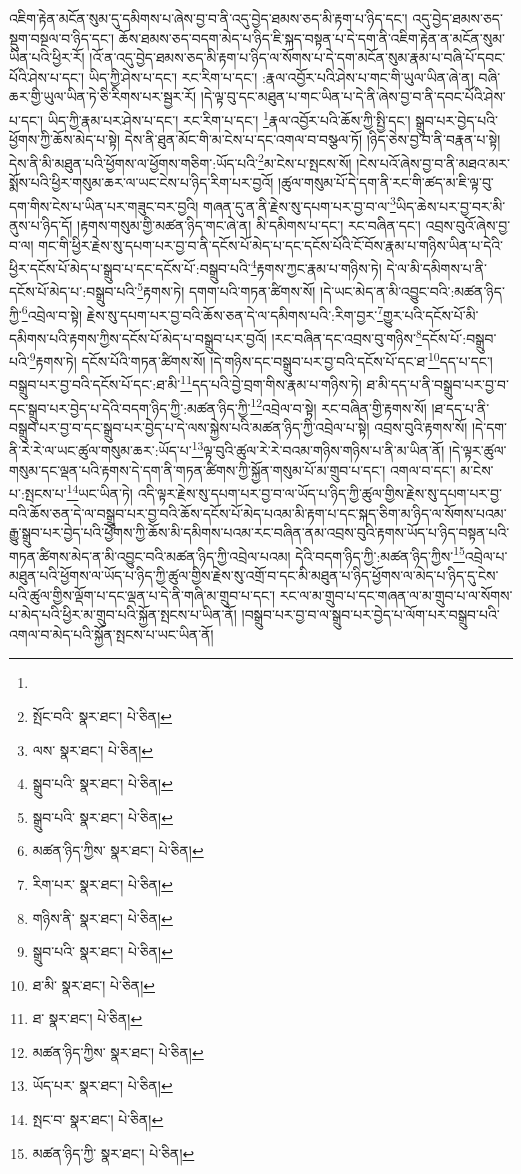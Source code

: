 འཇིག་རྟེན་མངོན་སུམ་དུ་དམིགས་པ་ཞེས་བྱ་བ་ནི་འདུ་བྱེད་ཐམས་ཅད་མི་རྟག་པ་ཉིད་དང་། འདུ་བྱེད་ཐམས་ཅད་སྡུག་བསྔལ་བ་ཉིད་དང་། ཆོས་ཐམས་ཅད་བདག་མེད་པ་ཉིད་ཇི་སྐད་བསྟན་པ་དེ་དག་ནི་འཇིག་རྟེན་ན་མངོན་སུམ་ཡིན་པའི་ཕྱིར་རོ། །འོ་ན་འདུ་བྱེད་ཐམས་ཅད་མི་རྟག་པ་ཉིད་ལ་སོགས་པ་དེ་དག་མངོན་སུམ་རྣམ་པ་བཞི་པོ་དབང་པོའི་ཤེས་པ་དང་། ཡིད་ཀྱི་ཤེས་པ་དང་། རང་རིག་པ་དང་། :རྣལ་འབྱོར་པའི་ཤེས་པ་གང་གི་ཡུལ་ཡིན་ཞེ་ན། བཞི་ཆར་གྱི་ཡུལ་ཡིན་ཏེ་ཅི་རིགས་པར་སྦྱར་རོ། །དེ་ལྟ་བུ་དང་མཐུན་པ་གང་ཡིན་པ་དེ་ནི་ཞེས་བྱ་བ་ནི་དབང་པོའི་ཤེས་པ་དང་། ཡིད་ཀྱི་རྣམ་པར་ཤེས་པ་དང་། རང་རིག་པ་དང་། \footnote{}རྣལ་འབྱོར་པའི་ཆོས་ཀྱི་སྤྱི་དང་། སྒྲུབ་པར་བྱེད་པའི་ཕྱོགས་ཀྱི་ཆོས་མེད་པ་སྟེ། དེས་ནི་ཐུན་མོང་གི་མ་ངེས་པ་དང་འགལ་བ་བསྩལ་ཏོ། །ཉིད་ཅེས་བྱ་བ་ནི་བརྣན་པ་སྟེ། དེས་ནི་མི་མཐུན་པའི་ཕྱོགས་ལ་ཕྱོགས་གཅིག་:ཡོད་པའི་\footnote{སྤོང་བའི་  སྣར་ཐང་།  པེ་ཅིན། }མ་ངེས་པ་སྤངས་སོ། །ངེས་པའོ་ཞེས་བྱ་བ་ནི་མཐའ་མར་སྨོས་པའི་ཕྱིར་གསུམ་ཆར་ལ་ཡང་ངེས་པ་ཉིད་རིག་པར་བྱའོ། །ཚུལ་གསུམ་པོ་དེ་དག་ནི་རང་གི་ཚད་མ་ཇི་ལྟ་བུ་དག་གིས་ངེས་པ་ཡིན་པར་གཟུང་བར་བྱའི། གཞན་དུ་ན་ནི་རྗེས་སུ་དཔག་པར་བྱ་བ་ལ་\footnote{ལས་  སྣར་ཐང་།  པེ་ཅིན། }ཡིད་ཆེས་པར་བྱ་བར་མི་ནུས་པ་ཉིད་དོ། །རྟགས་གསུམ་གྱི་མཚན་ཉིད་གང་ཞེ་ན། མི་དམིགས་པ་དང་། རང་བཞིན་དང་། འབྲས་བུའོ་ཞེས་བྱ་བ་ལ། གང་གི་ཕྱིར་རྗེས་སུ་དཔག་པར་བྱ་བ་ནི་དངོས་པོ་མེད་པ་དང་དངོས་པོའི་ངོ་བོས་རྣམ་པ་གཉིས་ཡིན་པ་དེའི་ཕྱིར་དངོས་པོ་མེད་པ་སྒྲུབ་པ་དང་དངོས་པོ་:བསྒྲུབ་པའི་\footnote{སྒྲུབ་པའི་  སྣར་ཐང་།  པེ་ཅིན། }རྟགས་ཀྱང་རྣམ་པ་གཉིས་ཏེ། དེ་ལ་མི་དམིགས་པ་ནི་དངོས་པོ་མེད་པ་:བསྒྲུབ་པའི་\footnote{སྒྲུབ་པའི་  སྣར་ཐང་།  པེ་ཅིན། }རྟགས་ཏེ། དགག་པའི་གཏན་ཚིགས་སོ། །དེ་ཡང་མེད་ན་མི་འབྱུང་བའི་:མཚན་ཉིད་ཀྱི་\footnote{མཚན་ཉིད་ཀྱིས་  སྣར་ཐང་།  པེ་ཅིན། }འབྲེལ་བ་སྟེ། རྗེས་སུ་དཔག་པར་བྱ་བའི་ཆོས་ཅན་དེ་ལ་དམིགས་པའི་:རིག་བྱར་\footnote{རིག་པར་  སྣར་ཐང་།  པེ་ཅིན། }གྱུར་པའི་དངོས་པོ་མི་དམིགས་པའི་རྟགས་ཀྱིས་དངོས་པོ་མེད་པ་བསྒྲུབ་པར་བྱའོ། །རང་བཞིན་དང་འབྲས་བུ་གཉིས་\footnote{གཉིས་ནི་  སྣར་ཐང་།  པེ་ཅིན། }དངོས་པོ་:བསྒྲུབ་པའི་\footnote{སྒྲུབ་པའི་  སྣར་ཐང་།  པེ་ཅིན། }རྟགས་ཏེ། དངོས་པོའི་གཏན་ཚིགས་སོ། །དེ་གཉིས་དང་བསྒྲུབ་པར་བྱ་བའི་དངོས་པོ་དང་ཐ་\footnote{ཐ་མི་  སྣར་ཐང་།  པེ་ཅིན། }དད་པ་དང་། བསྒྲུབ་པར་བྱ་བའི་དངོས་པོ་དང་:ཐ་མི་\footnote{ཐ་  སྣར་ཐང་།  པེ་ཅིན། }དད་པའི་བྱེ་བྲག་གིས་རྣམ་པ་གཉིས་ཏེ། ཐ་མི་དད་པ་ནི་བསྒྲུབ་པར་བྱ་བ་དང་སྒྲུབ་པར་བྱེད་པ་དེའི་བདག་ཉིད་ཀྱི་:མཚན་ཉིད་ཀྱི་\footnote{མཚན་ཉིད་ཀྱིས་  སྣར་ཐང་།  པེ་ཅིན། }འབྲེལ་བ་སྟེ། རང་བཞིན་གྱི་རྟགས་སོ། །ཐ་དད་པ་ནི་བསྒྲུབ་པར་བྱ་བ་དང་སྒྲུབ་པར་བྱེད་པ་དེ་ལས་སྐྱེས་པའི་མཚན་ཉིད་ཀྱི་འབྲེལ་པ་སྟེ། འབྲས་བུའི་རྟགས་སོ། །དེ་དག་ནི་རེ་རེ་ལ་ཡང་ཚུལ་གསུམ་ཆར་:ཡོད་པ་\footnote{ཡོད་པར་  སྣར་ཐང་།  པེ་ཅིན། }ལྟ་བུའི་ཚུལ་རེ་རེ་བའམ་གཉིས་གཉིས་པ་ནི་མ་ཡིན་ནོ། །དེ་ལྟར་ཚུལ་གསུམ་དང་ལྡན་པའི་རྟགས་དེ་དག་ནི་གཏན་ཚིགས་ཀྱི་སྐྱོན་གསུམ་པོ་མ་གྲུབ་པ་དང་། འགལ་བ་དང་། མ་ངེས་པ་:སྤངས་པ་\footnote{སྤང་བ་  སྣར་ཐང་།  པེ་ཅིན། }ཡང་ཡིན་ཏེ། འདི་ལྟར་རྗེས་སུ་དཔག་པར་བྱ་བ་ལ་ཡོད་པ་ཉིད་ཀྱི་ཚུལ་གྱིས་རྗེས་སུ་དཔག་པར་བྱ་བའི་ཆོས་ཅན་དེ་ལ་བསྒྲུབ་པར་བྱ་བའི་ཆོས་དངོས་པོ་མེད་པའམ་མི་རྟག་པ་དང་སྐད་ཅིག་མ་ཉིད་ལ་སོགས་པའམ་རྒྱུ་སྒྲུབ་པར་བྱེད་པའི་ཕྱོགས་ཀྱི་ཆོས་མི་དམིགས་པའམ་རང་བཞིན་ནམ་འབྲས་བུའི་རྟགས་ཡོད་པ་ཉིད་བསྟན་པའི་གཏན་ཚིགས་མེད་ན་མི་འབྱུང་བའི་མཚན་ཉིད་ཀྱི་འབྲེལ་པའམ། དེའི་བདག་ཉིད་ཀྱི་:མཚན་ཉིད་ཀྱིས་\footnote{མཚན་ཉིད་ཀྱི་  སྣར་ཐང་།  པེ་ཅིན། }འབྲེལ་པ་མཐུན་པའི་ཕྱོགས་ལ་ཡོད་པ་ཉིད་ཀྱི་ཚུལ་གྱིས་རྗེས་སུ་འགྲོ་བ་དང་མི་མཐུན་པ་ཉིད་ཕྱོགས་ལ་མེད་པ་ཉིད་དུ་ངེས་པའི་ཚུལ་གྱིས་ལྡོག་པ་དང་ལྡན་པ་དེ་ནི་གཞི་མ་གྲུབ་པ་དང་། རང་ལ་མ་གྲུབ་པ་དང་གཞན་ལ་མ་གྲུབ་པ་ལ་སོགས་པ་མེད་པའི་ཕྱིར་མ་གྲུབ་པའི་སྐྱོན་སྤངས་པ་ཡིན་ནོ། །བསྒྲུབ་པར་བྱ་བ་ལ་སྒྲུབ་པར་བྱེད་པ་ལོག་པར་བསྒྲུབ་པའི་འགལ་བ་མེད་པའི་སྐྱོན་སྤངས་པ་ཡང་ཡིན་ནོ། 